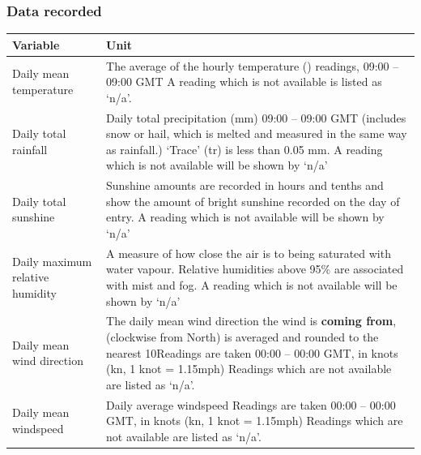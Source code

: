 \documentclass[fleqn, 11pt]{article}
\begin{document}
	\subsubsection{Data recorded}
	\begin{tabular}{|p{5.5cm}|p{11.5cm}|}
		\hline
		\textbf{Variable} & \textbf{Unit} \\
		\hline
		Daily mean temperature & The average of the hourly temperature (\textcelsius) readings, 09:00 – 09:00 GMT \newline A reading which is not available is listed as ‘n/a’.
		\\
		\hline
		Daily total rainfall & Daily total precipitation (mm) 09:00 – 09:00 GMT
		(includes snow or hail, which is melted and measured in the same way as rainfall.)
		‘Trace’ (tr) is less than 0.05 mm. \newline A reading which is not available will be shown by ‘n/a’
		\\
		\hline
		Daily total sunshine & Sunshine amounts are recorded in hours and tenths and show the amount of bright sunshine recorded on the day of entry. \newline A reading which is not available will be shown by ‘n/a’ \\
		\hline
		Daily maximum relative humidity & A measure of how close the air is to being saturated with water vapour. \newline Relative humidities above 95\% are associated with mist and fog. \newline A reading which is not available will be shown by ‘n/a’
		\\
		\hline
		Daily mean wind direction & The daily mean wind direction the wind is \textbf{coming from}, (clockwise from North) is averaged and rounded to the nearest 10\textdegree \newline Readings are taken 00:00 – 00:00 GMT, in knots (kn, 1 knot = 1.15mph) \newline
		Readings which are not available are listed as ‘n/a’.
		\\
		\hline
		Daily mean windspeed & Daily average windspeed \newline Readings are taken 00:00 – 00:00 GMT, in knots (kn, 1 knot = 1.15mph) \newline
		Readings which are not available are listed as ‘n/a’. \\

\end{tabular}
\end{document}
